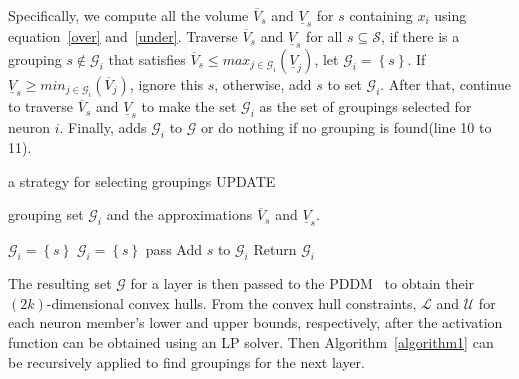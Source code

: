 \documentclass[runningheads]{llncs}
\begin{document}
Specifically, we compute all the volume $\overline{V}_{s}$ and $\underline{V}_{s}$ for $s$ containing $x_{i}$ using equation~\ref{over} and~\ref{under}.
Traverse $\overline{V}_{s}$ and $\underline{V}_{s}$ for all $s \subseteq \mathcal{S}$, 
if there is a grouping $s \notin \mathcal{G}_{i}$ that satisfies $\overline{V}_{s} \leq max_{j\in \mathcal{G}_{i}}(\underline{V}_{j})$, let $\mathcal{G}_{i} = \left \{s\right \}$. If $\underline{V}_{s} \geq min_{j\in \mathcal{G}_{i}}(\overline{V}_{j})$, ignore this $s$, otherwise, add $s$ to set $\mathcal{G}_{i}$. After that, continue to traverse $\overline{V}_{s}$ and $\underline{V}_{s}$ to make the set $\mathcal{G}_{i}$ as the set of groupings selected for neuron $i$.
Finally, adds $\mathcal{G}_{i}$ to $\mathcal{G}$ or do nothing if no grouping is found(line 10 to 11).
\begin{algorithm}[!h]
   \caption{a strategy for selecting groupings UPDATE}
   \label{algorithm2} 
\begin{algorithmic}[1]
   
    grouping set $\mathcal{G}_{i}$ and the approximations $\overline{V}_{s}$ and $\underline{V}_{s}$.
   

   \STATE $\mathcal{G}_{i}= \left\{s \right\}$
   \STATE $\mathcal{G}_{i} = \left \{s\right \}$
   \STATE pass
   \ELSE
   \STATE Add $s$ to $\mathcal{G}_{i}$
   \ENDIF
   \STATE Return $\mathcal{G}_{i}$

\end{algorithmic}
\end{algorithm}

The resulting set $\mathcal{G}$ for a layer is then passed to the PDDM~\cite{DBLP:journals/pacmpl/MullerMSPV22} to obtain their $(2k)$-dimensional convex hulls.
From the convex hull constraints, $\mathcal{L}$ and $\mathcal{U}$ for each neuron member's lower and upper bounds, respectively, after the activation function can be obtained using an LP solver.
Then Algorithm~\ref{algorithm1} can be recursively applied to find groupings for the next layer. 
%
%
%
\end{document}
